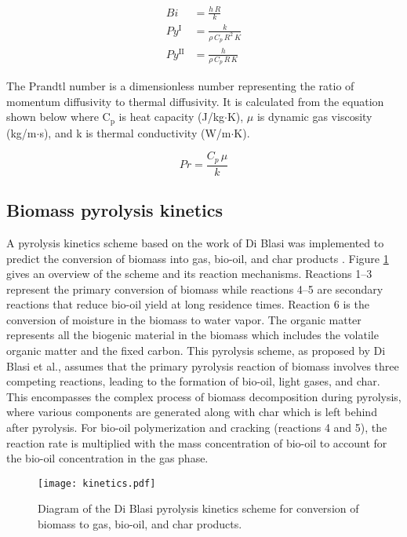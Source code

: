 \begin{align}
    Bi &= \frac{h\,R}{k} \label{eq:biot} \\
    Py^{\textrm{I}} &= \frac{k}{\rho\,C_p\,R^2\,K} \label{eq:pynumber1} \\
    Py^{\textrm{II}} &= \frac{h}{\rho\,C_p\,R\,K} \label{eq:pynumber2}
\end{align}

The Prandtl number is a dimensionless number representing the ratio of momentum diffusivity to thermal diffusivity. It is calculated from the equation shown below where C$_\text{p}$ is heat capacity (J/kg$\cdot$K), $\mu$ is dynamic gas viscosity (kg/m$\cdot$s), and k is thermal conductivity (W/m$\cdot$K).

\begin{equation}
    Pr = \frac{C_p\, \mu}{k}
\end{equation}


\subsection{Biomass pyrolysis kinetics}

A pyrolysis kinetics scheme based on the work of Di Blasi was implemented to predict the conversion of biomass into gas, bio-oil, and char products \cite{Blasi-1993,Blasi-2001}. Figure \ref{fig:blasi} gives an overview of the scheme and its reaction mechanisms. Reactions 1--3 represent the primary conversion of biomass while reactions 4--5 are secondary reactions that reduce bio-oil yield at long residence times. Reaction 6 is the conversion of moisture in the biomass to water vapor. The organic matter represents all the biogenic material in the biomass which includes the volatile organic matter and the fixed carbon. This pyrolysis scheme, as proposed by Di Blasi et al., assumes that the primary pyrolysis reaction of biomass involves three competing reactions, leading to the formation of bio-oil, light gases, and char. This encompasses the complex process of biomass decomposition during pyrolysis, where various components are generated along with char which is left behind after pyrolysis. For bio-oil polymerization and cracking (reactions 4 and 5), the reaction rate is multiplied with the mass concentration of bio-oil to account for the bio-oil concentration in the gas phase.

\begin{figure}[H]
    \centering
    \texttt{[image: kinetics.pdf]}
    \caption{Diagram of the Di Blasi pyrolysis kinetics scheme for conversion of biomass to gas, bio-oil, and char products.}
    \label{fig:blasi}
\end{figure}

